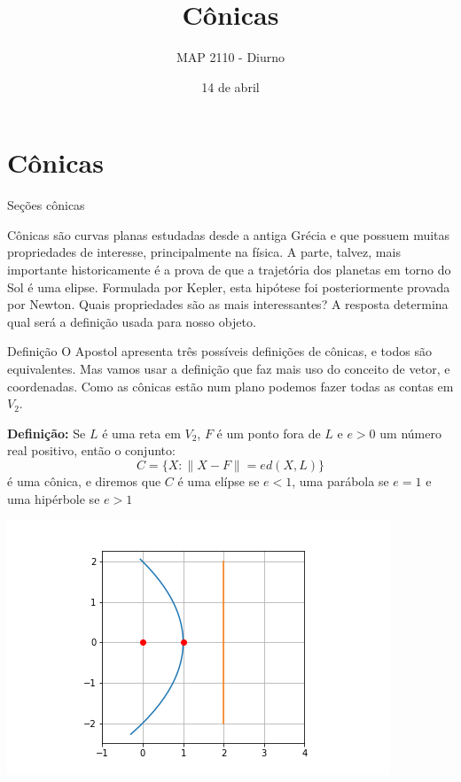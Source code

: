 \documentclass{beamer}
\title[Conicas]{Cônicas}
\author{MAP 2110 - Diurno}
\institute{IME USP}
\date{14 de abril}
\begin{document}
\begin{frame}
  \titlepage
\end{frame}



\section{Cônicas}

\begin{frame}{Seções cônicas}

  Cônicas são curvas planas estudadas desde a antiga Grécia e que possuem muitas
  propriedades de interesse, principalmente na física. A parte, talvez, mais 
  importante historicamente é a prova de que a trajetória dos planetas em torno do 
  Sol é uma elipse. Formulada por Kepler, esta hipótese foi posteriormente provada
  por Newton. Quais propriedades são as mais interessantes? A resposta determina 
  qual será a definição usada para nosso objeto.

  
\end{frame}

\begin{frame}{Definição}
  O Apostol apresenta três possíveis definições de cônicas, e todos são equivalentes.
  Mas vamos usar a definição que faz mais uso do conceito de vetor, e coordenadas.
  Como as cônicas estão num plano podemos fazer todas as contas em $V_2$.

  \textbf{Definição:} Se $L$ é uma reta em $V_2$, $F$ é um ponto fora de $L$ e $e>0$ um 
  número real positivo, então o conjunto:
  $$ C=\{X : \|X-F\| = e d(X,L)    \}$$ é uma cônica, e diremos que $C$ é uma elípse se 
  $e<1$, uma parábola se $e=1$ e uma hipérbole se $e>1$
\end{frame}

\begin{frame}

  \includegraphics{conica3.png}

\end{frame}
\end{document}
